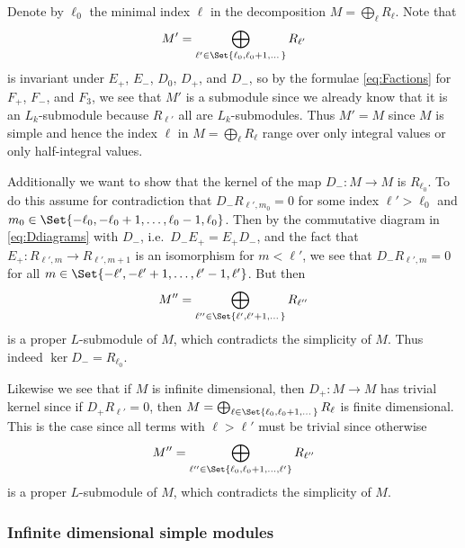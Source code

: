 Denote by $\ell_0$ the minimal index $\ell$ in the decomposition $M=\bigoplus_\ell R_\ell$. Note that
\begin{align*}
  M' = \bigoplus_{\ell'\in\Set{\ell_0,\ell_0+1,\dotsc}} R_{\ell'}
\end{align*}
is invariant under $E_+$, $E_-$, $D_0$, $D_+$, and $D_-$, so by the formulae \cref{eq:Factions} for $F_+$, $F_-$, and $F_3$, we see that $M'$ is a submodule since we already know that it is an $L_k$-submodule because $R_{\ell'}$ all are $L_k$-submodules. Thus $M'=M$ since $M$ is simple and hence the index $\ell$ in $M=\bigoplus_\ell R_\ell$ range over only integral values or only half-integral values.

Additionally we want to show that the kernel of the map $D_-\colon M\to M$ is $R_{\ell_0}$. To do this assume for contradiction that $D_-R_{\ell',m_0}=0$ for some index $\ell'>\ell_0$ and $m_0\in\Set{-\ell_0,-\ell_0+1,\dotsc,\ell_0-1,\ell_0}$. Then by the commutative diagram in \cref{eq:Ddiagrams} with $D_-$, i.e.\ $D_-E_+=E_+D_-$, and the fact that $E_+\colon R_{\ell',m}\to R_{\ell',m+1}$ is an isomorphism for $m<\ell'$, we see that $D_-R_{\ell',m}=0$ for all $m\in\Set{-\ell',-\ell'+1,\dotsc,\ell'-1,\ell'}$. But then
\begin{align*}
  M'' = \bigoplus_{\ell''\in\Set{\ell',\ell'+1,\dotsc}} R_{\ell''}
\end{align*}
is a proper $L$-submodule of $M$, which contradicts the simplicity of $M$. Thus indeed $\ker D_- = R_{\ell_0}$.

Likewise we see that if $M$ is infinite dimensional, then $D_+\colon M\to M$ has trivial kernel since if $D_+R_{\ell'}=0$, then $M=\bigoplus_{\ell\in\Set{\ell_0,\ell_0+1,\dotsc}} R_{\ell}$ is finite dimensional. This is the case since all terms with $\ell>\ell'$ must be trivial since otherwise
\begin{align*}
  M'' = \bigoplus_{\ell''\in\Set{\ell_0,\ell_0+1,\dotsc,\ell'}} R_{\ell''}
\end{align*}
is a proper $L$-submodule of $M$, which contradicts the simplicity of $M$.

\subsubsection{Infinite dimensional simple modules}


